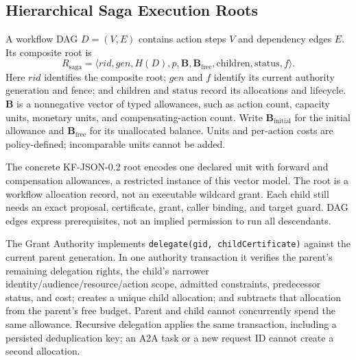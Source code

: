 \subsection{Hierarchical Saga Execution Roots}
\label{sec:saga}
A workflow DAG $D=(V,E)$ contains action steps $V$ and dependency edges $E$. Its composite root is
\begin{equation}
R_{\mathrm{saga}}=\langle rid,gen,H(D),p,\mathbf{B},
\mathbf{B}_{\mathrm{free}},\mathrm{children},\mathrm{status},f\rangle .
\end{equation}
Here $rid$ identifies the composite root; $gen$ and $f$ identify its current authority generation and fence; and $\mathrm{children}$ and $\mathrm{status}$ record its allocations and lifecycle. $\mathbf{B}$ is a nonnegative vector of typed allowances, such as action count, capacity units, monetary units, and compensating-action count. Write $\mathbf{B}_{\mathrm{initial}}$ for the initial allowance and $\mathbf{B}_{\mathrm{free}}$ for its unallocated balance. Units and per-action costs are policy-defined; incomparable units cannot be added.

The concrete KF-JSON-0.2 root encodes one declared unit with forward and compensation allowances, a restricted instance of this vector model. The root is a workflow allocation record, not an executable wildcard grant. Each child still needs an exact proposal, certificate, grant, caller binding, and target guard. DAG edges express prerequisites, not an implied permission to run all descendants.

The Grant Authority implements \texttt{delegate(gid, childCertificate)} against the current parent generation. In one authority transaction it verifies the parent's remaining delegation rights, the child's narrower identity/audience/resource/action scope, admitted constraints, predecessor status, and cost; creates a unique child allocation; and subtracts that allocation from the parent's free budget. Parent and child cannot concurrently spend the same allowance. Recursive delegation applies the same transaction, including a persisted deduplication key; an A2A task or a new request ID cannot create a second allocation.

